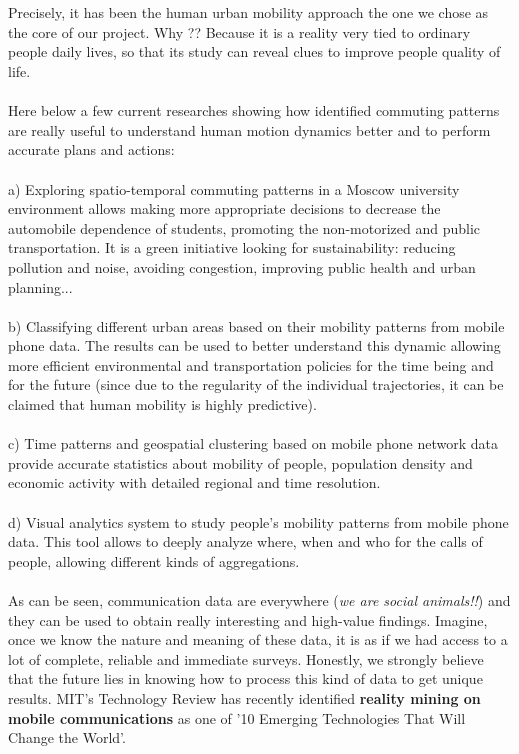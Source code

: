\\
\\
Precisely, it has been the human urban mobility approach the one we chose as the core of our project. Why ?? Because it is a reality very tied to ordinary people daily lives, so that its study can reveal clues to improve people quality of life.
\\
\\
Here below a few current researches showing how identified commuting patterns are really useful to understand human motion dynamics better and to perform accurate plans and actions:
\\
\\
a) Exploring spatio-temporal commuting patterns in a Moscow university environment allows making more appropriate decisions to decrease the automobile dependence of students, promoting the non-motorized and public transportation. It is a green initiative looking for sustainability: reducing pollution and noise, avoiding congestion, improving public health and urban planning...
\\
\\
b) Classifying different urban areas based on their mobility patterns from mobile phone data. The results can be used to better understand this dynamic allowing more efficient environmental and transportation policies for the time being and for the future (since due to the regularity of the individual trajectories, it can be claimed that human mobility is highly predictive).
\\
\\
c) Time patterns and geospatial clustering based on mobile phone network data provide accurate statistics about mobility of people, population density and economic activity with detailed regional and time resolution.
\\
\\
d) Visual analytics system to study people's mobility patterns from mobile phone data. This tool allows to deeply analyze where, when and who for the calls of  people, allowing different kinds of aggregations.
\\
\\
As can be seen, communication data are everywhere ({\it we are social animals!!}) and they can be used to obtain really interesting and high-value findings. Imagine, once we know the nature and meaning of these data, it is as if we had access to a lot of complete, reliable and immediate surveys. Honestly, we strongly believe that the future lies in knowing how to process this kind of data to get unique results. MIT's Technology Review has recently identified {\bf reality mining on mobile communications} as one of '10 Emerging Technologies That Will Change the World'.
\\
\\